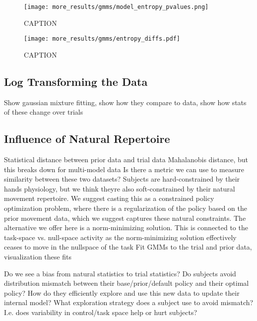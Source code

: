 \documentclass[../main.tex]{subfiles}
\begin{document}
\begin{figure}[tph]
  \centering
    \texttt{[image: more\_results/gmms/model\_entropy\_pvalues.png]}
    \caption[Entropy of subject GMMs]{CAPTION}\label{fig:gmm_entropy_pvalues}
\end{figure}

\begin{figure}[tph]
  \centering
    \texttt{[image: more\_results/gmms/entropy\_diffs.pdf]}
    \caption[Successive GMM entropy differences]{CAPTION}\label{fig:gmm_entropy_diffs}
\end{figure}


\subsection{Log Transforming the Data}

Show gaussian mixture fitting, show how they compare to data, show how stats of these change over trials



\subsection{Influence of Natural Repertoire}

Statistical distance between prior data and trial data
Mahalanobis distance, but this breaks down for multi-model data
Is there a metric we can use to measure similarity between these two datasets?
Subjects are hard-constrained by their hands physiology, but we think theyre also soft-constrained by their natural movement repertoire. We suggest casting this as a constrained policy optimization problem, where there is a regularization of the policy based on the prior movement data, which we suggest captures these natural constraints. The alternative we offer here is a norm-minimizing solution.
This is connected to the task-space vs. null-space activity as the norm-minimizing solution effectively ceases to move in the nullspace of the task
Fit GMMs to the trial and prior data, visualization these fits


Do we see a bias from natural statistics to trial statistics?
Do subjects avoid distribution mismatch between their base/prior/default policy and their optimal policy? How do they efficiently explore and use this new data to update their internal model?
What exploration strategy does a subject use to avoid mismatch? I.e. does variability in control/task space help or hurt subjects?





\end{document}
